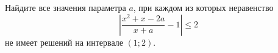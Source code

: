 \begin{ex}
	\begin{condition}
		Найдите все значения параметра \( a \), при каждом из которых неравенство \[ \left| \dfrac{x^2+x-2a}{x+a}-1  \right|\le2 \] не имеет решений на интервале \( (1;2) \).
	\end{condition}
	\answer{\( \left( -\infty;-\dfrac{1}{5} \right]\cup[8;+\infty) \)}
\end{ex}